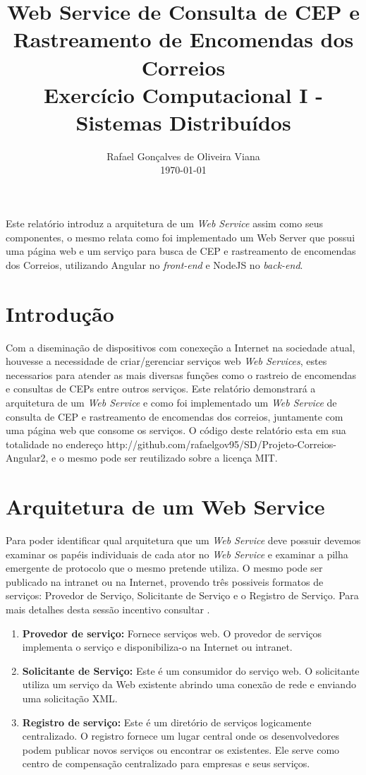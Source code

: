 \documentclass[12pt]{article}
\title{Web Service de Consulta de CEP e Rastreamento de Encomendas dos Correios  \\ Exercício Computacional I - Sistemas Distribuídos}
\author{Rafael Gonçalves de Oliveira Viana\inst{1} \\\vspace*{10pt} \normalsize  \today{} }
\begin{document}
 

\maketitle

     
\begin{resumo} 	
  Este relatório introduz a arquitetura de um \textit{Web Service} assim como seus componentes, o mesmo relata como foi implementado um Web Server que possui uma página web e um serviço para busca de CEP e rastreamento de encomendas dos Correios, utilizando Angular no \textit{front-end} e NodeJS no \textit{back-end}.
\end{resumo}



\section{Introdução}
  Com a diseminação de dispositivos com conexeção a Internet na sociedade atual, houvesse a necessidade de criar/gerenciar serviços web \textit{Web Services}, estes necessarios para atender as mais diversas funções como o rastreio de encomendas e consultas de CEPs entre outros serviços.
  Este relatório demonstrará  a arquitetura de um \textit{Web Service} e como foi implementado um \textit{Web Service} de consulta de CEP e rastreamento de encomendas dos correios, juntamente com uma página web que consome os serviços.
  O código deste relatório esta em sua totalidade no endereço http://github.com/rafaelgov95/SD/Projeto-Correios-Angular2, e o mesmo pode ser reutilizado sobre a licença MIT.
\section{Arquitetura de um Web Service}
Para poder identificar qual arquitetura que um \textit{Web Service} deve possuir devemos examinar os papéis individuais de cada ator no \textit{Web Service} e examinar a pilha emergente de protocolo que o mesmo pretende utiliza.
O mesmo pode ser publicado na intranet ou na Internet, provendo três possiveis formatos de serviços: Provedor de Serviço, Solicitante de Serviço e o Registro de Serviço.
Para mais detalhes desta sessão incentivo consultar \cite{tutorial}. 

\begin{enumerate}
	\item \textbf{Provedor de serviço:}
	Fornece serviços web. O provedor de serviços implementa o serviço e disponibiliza-o na Internet ou intranet.
	\item \textbf{Solicitante de Serviço:}
	Este é um consumidor do serviço web. O solicitante utiliza um serviço da Web existente abrindo uma conexão de rede e enviando uma solicitação XML.
	\item \textbf{Registro de serviço:}
	Este é um diretório de serviços logicamente centralizado. O registro fornece um lugar central onde os desenvolvedores podem publicar novos serviços ou encontrar os existentes. Ele serve como centro de compensação centralizado para empresas e seus serviços.
\end{enumerate}
\end{document}
